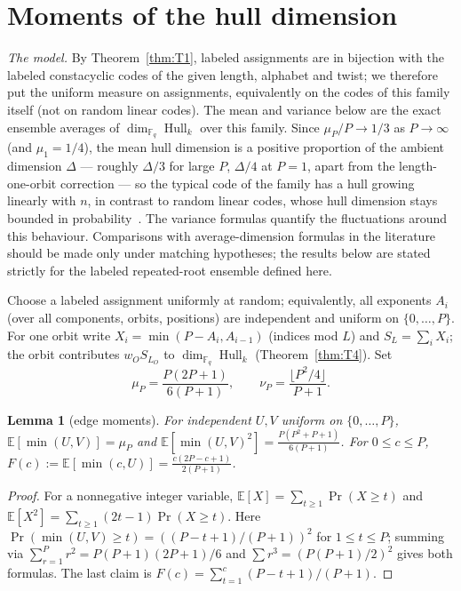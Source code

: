 \documentclass[11pt]{article}
\newtheorem{lemma}[theorem]{Lemma}
\theoremstyle{definition}
\theoremstyle{remark}
\newcommand{\Fq}{\mathbb{F}_q}
\newcommand{\Hull}{\operatorname{Hull}}
\newcommand{\E}{\mathbb{E}}
\begin{document}
\section{Moments of the hull dimension}\label{sec:moments}

\emph{The model.} By Theorem~\ref{thm:T1}, labeled assignments are in
bijection with the labeled constacyclic codes of the given length,
alphabet and twist; we therefore put the uniform measure on assignments,
equivalently on the codes of this family itself (not on random linear
codes). The mean and variance below are the exact ensemble averages of
\(\dim_{\Fq}\Hull_k\) over this family. Since
\(\mu_P / P \to 1/3\) as \(P \to \infty\) (and \(\mu_1 = 1/4\)), the mean
hull dimension is a positive proportion of the ambient dimension
\(\Delta\) --- roughly \(\Delta/3\) for large \(P\), \(\Delta/4\) at
\(P = 1\), apart from the length-one-orbit correction --- so the typical
code of the family has a hull growing linearly with \(n\), in contrast
to random linear codes, whose hull dimension stays bounded in
probability~\cite{Sendrier1997}. The variance formulas quantify the
fluctuations around this behaviour. Comparisons with average-dimension formulas in the literature
should be made only under matching hypotheses; the results below are
stated strictly for the labeled repeated-root ensemble defined here.

Choose a labeled assignment uniformly at random; equivalently, all
exponents \(A_i\) (over all components, orbits, positions) are
independent and uniform on \(\{0,\dots,P\}\). For one orbit write
\(X_i = \min(P-A_i, A_{i-1})\) (indices mod \(L\)) and
\(S_L = \sum_i X_i\); the orbit contributes \(w_O S_{L_O}\) to
\(\dim_{\Fq}\Hull_k\) (Theorem~\ref{thm:T4}). Set
\[
\mu_P = \frac{P(2P+1)}{6(P+1)},
\qquad
\nu_P = \frac{\lfloor P^2/4 \rfloor}{P+1}.
\]

\begin{lemma}[edge moments]\label{lem:edge}
For independent \(U, V\) uniform on \(\{0,\dots,P\}\),
\(\E[\min(U,V)] = \mu_P\) and
\(\E[\min(U,V)^2] = \frac{P(P^2+P+1)}{6(P+1)}\).
For \(0 \le c \le P\), \(F(c) := \E[\min(c,U)] =
\frac{c(2P-c+1)}{2(P+1)}\).
\end{lemma}

\begin{proof}
For a nonnegative integer variable,
\(\E[X] = \sum_{t\ge1} \Pr(X \ge t)\) and
\(\E[X^2] = \sum_{t\ge1} (2t-1)\Pr(X\ge t)\).
Here \(\Pr(\min(U,V) \ge t) = ((P-t+1)/(P+1))^2\) for \(1 \le t \le P\);
summing via \(\sum_{r=1}^P r^2 = P(P+1)(2P+1)/6\) and
\(\sum r^3 = (P(P+1)/2)^2\) gives both formulas. The last claim is
\(F(c) = \sum_{t=1}^c (P-t+1)/(P+1)\).
\end{proof}
\end{document}
